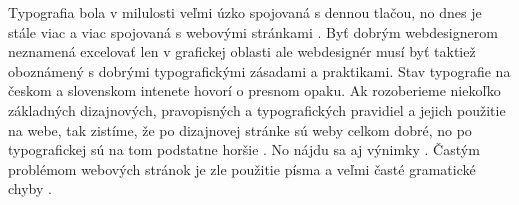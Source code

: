 \documentclass[a4paper, 11pt, times]{article}
\begin{document}
Typografia bola v milulosti veľmi úzko spojovaná s dennou tlačou, no dnes je stále viac a viac
spojovaná s webovými stránkami \citep{Krynin:2017}.
Byť dobrým webdesignerom neznamená excelovať len v grafickej oblasti ale webdesignér musí byť taktiež oboznámený
s dobrými typografickými zásadami a praktikami.
Stav typografie na českom a slovenskom intenete hovorí o presnom opaku. Ak rozoberieme
niekoľko základných dizajnových, pravopisných a typografických pravidiel a jejich použitie na webe, tak zistíme,
že po dizajnovej stránke sú weby celkom dobré, no po typografickej sú na tom podstatne horšie \citep{Kaspar:2016}.
No nájdu sa aj výnimky \citep{Cblog:2016}.
Častým problémom webových stránok je zle použitie písma a veľmi časté gramatické chyby \citep{Cecetka:2010}.
\newpage




\end{document}
